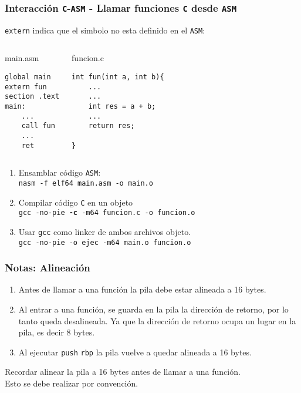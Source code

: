 \documentclass[aspectratio=169]{beamer}
\begin{document}
\begin{frame}[fragile]
\frametitle{Interacción \texttt{C}-\texttt{ASM} - \textbf{Llamar funciones \texttt{C} desde \texttt{ASM}}}
\texttt{extern} indica que el simbolo no esta definido en el \texttt{ASM}:
\begin{small}
\begin{columns}
\column{2.0in}
\begin{block}{main.asm}
\vspace{-0.5cm}
\begin{verbatim}
global main
extern fun
section .text
main:
    ...
    call fun
    ...
    ret
\end{verbatim}
\vspace{-0.3cm}
\end{block}

\column{2.0in}
\begin{block}{funcion.c}
\vspace{-0.5cm}
\begin{verbatim}
int fun(int a, int b){
    ...
    ...
    int res = a + b;
    ...
    return res;

}
\end{verbatim}
\vspace{-0.3cm}
\end{block}
\end{columns}
\end{small}
\pause
\medskip
\begin{enumerate}
\item Ensamblar código \texttt{ASM}:\\
\texttt{nasm -f elf64 main.asm -o main.o}
\item Compilar código \texttt{C} en un objeto\\
\texttt{gcc -no-pie \textbf{-c} -m64 funcion.c -o funcion.o}
\item Usar \texttt{gcc} como linker de ambos archivos objeto.\\
\texttt{gcc -no-pie -o ejec -m64 main.o funcion.o}
\end{enumerate}
\end{frame}

\begin{frame}
    \frametitle{Notas: Alineación}
    \begin{enumerate}
    \setlength\itemsep{0.5cm}
    \item Antes de llamar a una función la pila debe estar alineada a 16 bytes.
    \pause
    \item Al entrar a una función, se guarda en la pila la dirección de retorno, por lo tanto queda desalineada. Ya que la dirección de retorno ocupa un lugar en la pila, es decir 8 bytes.
    \pause
    \item Al ejecutar \texttt{push} \texttt{rbp} la pila vuelve a quedar alineada a 16 bytes.
    \end{enumerate}
    \pause
    \bigskip
    Recordar alinear la pila a 16 bytes antes de llamar a una función.\\
    \textcolor{verdeuca}{Esto se debe realizar por convención.}
\end{frame}
\end{document}
